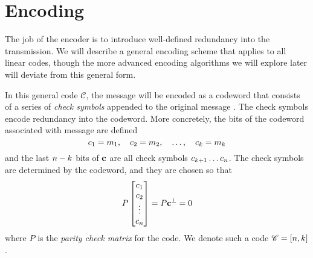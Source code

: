 \documentclass[12pt,twoside]{reedthesis}
\theoremstyle{definition}
\begin{document}
\section{Encoding}
The job of the encoder is to introduce well-defined redundancy into the transmission. We will describe a general encoding scheme that applies to all linear codes, though the more advanced encoding algorithms we will explore later will deviate from this general form.

In this general code $\mathscr{C}$, the message will be encoded as a codeword that consists of a series of \textit{check symbols} appended to the original message \mess. The check symbols encode redundancy into the codeword. More concretely, the bits of the codeword \cw associated with message \mess are defined
\begin{equation*}
c_{1} = m_{1}, \quad c_{2} = m_{2}, \quad \ldots,\quad c_{k} = m_{k}
\end{equation*}
and the last $n-k$ bits of $\mathbf{c}$ are all check symbols $c_{k+1} \ldots c_{n}$. The check symbols are determined by the codeword, and they are chosen so that 
\begin{equation*}
P \begin{bmatrix}
c_{1}\\
c_{2}\\
\vdots\\
c_{n}
\end{bmatrix} = 
P \mathbf{c}^{\bot}= 0
\end{equation*}
where $P$ is the \textit{parity check matrix} for the code. We denote such a code $\mathscr{C} = [n, k]$.
\end{document}
